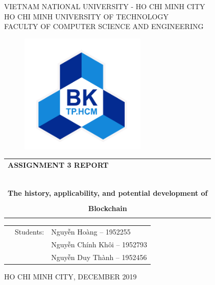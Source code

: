 \documentclass[a4paper]{article}
\begin{document}
	\begin{titlepage}
		\begin{center}
			VIETNAM NATIONAL UNIVERSITY - HO CHI MINH CITY \\
			HO CHI MINH UNIVERSITY OF TECHNOLOGY \\
			FACULTY OF COMPUTER SCIENCE AND ENGINEERING 
		\end{center}
		\vspace{1cm}
		\begin{figure}[h!]
			\begin{center}
				\includegraphics[width=6cm]{BK.png}
			\end{center}
		\end{figure}
		\vspace{1cm}
		\begin{center}
			\begin{tabular}{c}
				\multicolumn{1}{l}{\textbf{{\Large ASSIGNMENT 3 REPORT}}}\\
				~~\\
				\hline
				\\
				\multicolumn{1}{l}{\textbf{{\Large The history, applicability, and potential development of}}}\\
				\\
				\textbf{{\Huge Blockchain}}\\
				\\
				\hline
			\end{tabular}
		\end{center}
		\vspace{3cm}
		\begin{table}[h]
			\begin{tabular}{rrl}
				\hspace{5 cm} & Students: & Nguyễn Hoàng -- 1952255\\
				& & Nguyễn Chính Khôi -- 1952793\\
				& & Nguyễn Duy Thành -- 1952456\\
			\end{tabular}
		\end{table}
		\begin{center}
			{\footnotesize HO CHI MINH CITY, DECEMBER 2019}
		\end{center}
	\end{titlepage}
	
\end{document}
